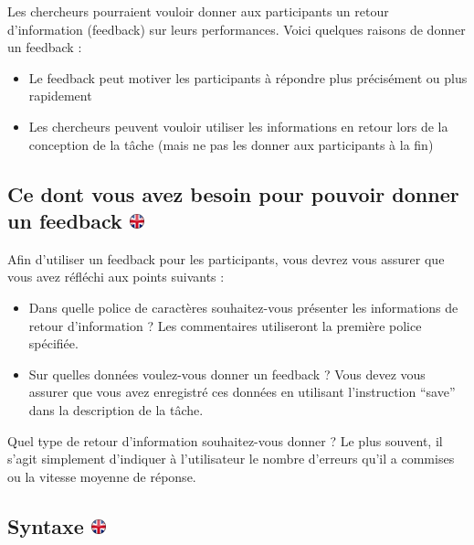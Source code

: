 \documentclass[
]{book}
\providecommand{\tightlist}{%
  \setlength{\itemsep}{0pt}\setlength{\parskip}{0pt}}
\begin{document}
Les chercheurs pourraient vouloir donner aux participants un retour d'information (feedback) sur leurs performances. Voici quelques raisons de donner un feedback :

\begin{itemize}
\tightlist
\item
  Le feedback peut motiver les participants à répondre plus précisément ou plus rapidement
\item
  Les chercheurs peuvent vouloir utiliser les informations en retour lors de la conception de la tâche (mais ne pas les donner aux participants à la fin)
\end{itemize}

\hypertarget{ce-dont-vous-avez-besoin-pour-pouvoir-donner-un-feedback}{%
\subsection[Ce dont vous avez besoin pour pouvoir donner un feedback ]{\texorpdfstring{Ce dont vous avez besoin pour pouvoir donner un feedback \href{https://www.psytoolkit.org/doc3.1.0/feedback.html\#_what_you_need_to_be_able_to_give_feedback}{\protect\includegraphics{img/ukflag.png}}}{Ce dont vous avez besoin pour pouvoir donner un feedback }}\label{ce-dont-vous-avez-besoin-pour-pouvoir-donner-un-feedback}}

Afin d'utiliser un feedback pour les participants, vous devrez vous assurer que vous avez réfléchi aux points suivants :

\begin{itemize}
\tightlist
\item
  Dans quelle police de caractères souhaitez-vous présenter les informations de retour d'information ? Les commentaires utiliseront la première police spécifiée.
\item
  Sur quelles données voulez-vous donner un feedback ? Vous devez vous assurer que vous avez enregistré ces données en utilisant l'instruction ``save'' dans la description de la tâche.
\end{itemize}

Quel type de retour d'information souhaitez-vous donner ? Le plus souvent, il s'agit simplement d'indiquer à l'utilisateur le nombre d'erreurs qu'il a commises ou la vitesse moyenne de réponse.

\hypertarget{syntaxe}{%
\subsection[Syntaxe ]{\texorpdfstring{Syntaxe \href{https://www.psytoolkit.org/doc3.1.0/feedback.html\#_syntax}{\protect\includegraphics{img/ukflag.png}}}{Syntaxe }}\label{syntaxe}}
\end{document}
